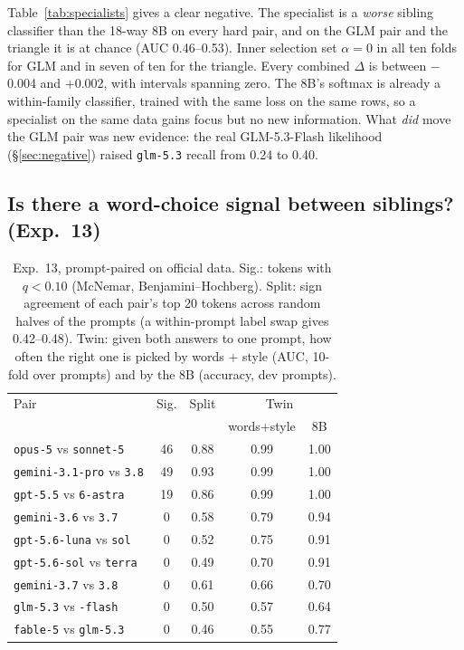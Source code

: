 \documentclass[10pt,twocolumn,letterpaper]{article}
\begin{document}
Table~\ref{tab:specialists} gives a clear negative. The specialist is a \emph{worse} sibling classifier than the 18-way 8B on every hard pair, and on the GLM pair and the triangle it is at chance (AUC 0.46--0.53). Inner selection set $\alpha=0$ in all ten folds for GLM and in seven of ten for the triangle. Every combined $\Delta$ is between $-$0.004 and +0.002, with intervals spanning zero. The 8B's softmax is already a within-family classifier, trained with the same loss on the same rows, so a specialist on the same data gains focus but no new information. What \emph{did} move the GLM pair was new evidence: the real GLM-5.3-Flash likelihood (\S\ref{sec:negative}) raised \texttt{glm-5.3} recall from 0.24 to 0.40.

\subsection{Is there a word-choice signal between siblings? (Exp.~13)}
\label{sec:words}

\begin{table}[t]
\centering\small
\caption{Exp.~13, prompt-paired on official data. Sig.: tokens with $q<0.10$ (McNemar, Benjamini--Hochberg). Split: sign agreement of each pair's top 20 tokens across random halves of the prompts (a within-prompt label swap gives 0.42--0.48). Twin: given both answers to one prompt, how often the right one is picked by words + style (AUC, 10-fold over prompts) and by the 8B (accuracy, dev prompts).}
\label{tab:siblingwords}
\setlength{\tabcolsep}{3pt}
\begin{tabular}{lcccc}
\toprule
Pair & Sig. & Split & \multicolumn{2}{c}{Twin} \\
 & & & words+style & 8B \\
\midrule
\texttt{opus-5} vs \texttt{sonnet-5} & 46 & 0.88 & 0.99 & 1.00 \\
\texttt{gemini-3.1-pro} vs \texttt{3.8} & 49 & 0.93 & 0.99 & 1.00 \\
\texttt{gpt-5.5} vs \texttt{6-astra} & 19 & 0.86 & 0.99 & 1.00 \\
\midrule
\texttt{gemini-3.6} vs \texttt{3.7} & 0 & 0.58 & 0.79 & 0.94 \\
\texttt{gpt-5.6-luna} vs \texttt{sol} & 0 & 0.52 & 0.75 & 0.91 \\
\texttt{gpt-5.6-sol} vs \texttt{terra} & 0 & 0.49 & 0.70 & 0.91 \\
\texttt{gemini-3.7} vs \texttt{3.8} & 0 & 0.61 & 0.66 & 0.70 \\
\texttt{glm-5.3} vs \texttt{-flash} & 0 & 0.50 & 0.57 & 0.64 \\
\texttt{fable-5} vs \texttt{glm-5.3} & 0 & 0.46 & 0.55 & 0.77 \\
\bottomrule
\end{tabular}
\end{table}
\end{document}
